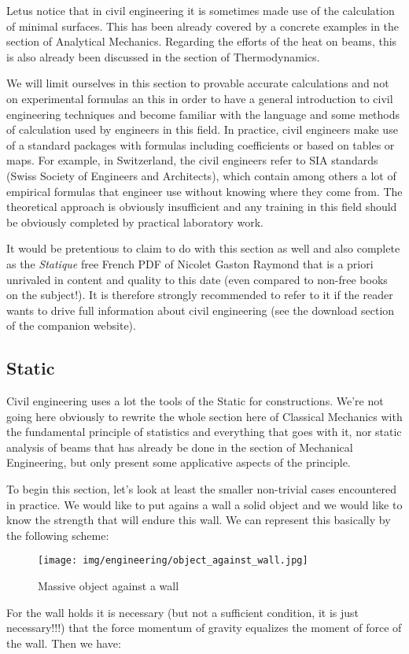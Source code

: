	Letus notice that in civil engineering it is sometimes made use of the calculation of minimal surfaces. This has been already covered by a concrete examples in the section of Analytical Mechanics. Regarding the efforts of the heat on beams, this is also already been discussed in the section of Thermodynamics.
	
	We will limit ourselves in this section to provable accurate calculations and not on experimental formulas an this in order to have a general introduction to civil engineering techniques and become familiar with the language and some methods of calculation used by engineers in this field. In practice, civil engineers make use of a standard packages with formulas including coefficients or based on tables or maps. For example, in Switzerland, the civil engineers refer to SIA standards (Swiss Society of Engineers and Architects), which contain among others a lot of empirical formulas that engineer use without knowing where they come from. The theoretical approach is obviously insufficient and any training in this field should be obviously completed by practical laboratory work.
	\begin{tcolorbox}[title=Remark,colframe=black,arc=10pt]
	It would be pretentious to claim to do with this section as well and also complete as the \textit{Statique} free French PDF of Nicolet Gaston Raymond that is a priori unrivaled in content and quality to this date (even compared to non-free books on the subject!). It is therefore strongly recommended to refer to it if the reader wants to drive full information about civil engineering (see the download section of the companion website).
	\end{tcolorbox}
	
	\pagebreak
	\subsection{Static}
	Civil engineering uses a lot the tools of the Static for constructions. We're not going here obviously to rewrite the whole section here of Classical Mechanics with the fundamental principle of statistics and everything that goes with it, nor static analysis of beams that has already be done in the section of Mechanical Engineering, but only present some applicative aspects of the principle.
	
	To begin this section, let's look at least the smaller non-trivial cases encountered in practice. We would like to put agains a wall a solid object and we would like to know the strength that will endure this wall. We can represent this basically by the following scheme:
	\begin{figure}[H]
		\centering
		\texttt{[image: img/engineering/object\_against\_wall.jpg]}
		\caption{Massive object against a wall}
	\end{figure}
	For the wall holds it is necessary (but not  a sufficient condition, it is just necessary!!!) that the force momentum of gravity equalizes the moment of force of the wall. Then we have:
	
